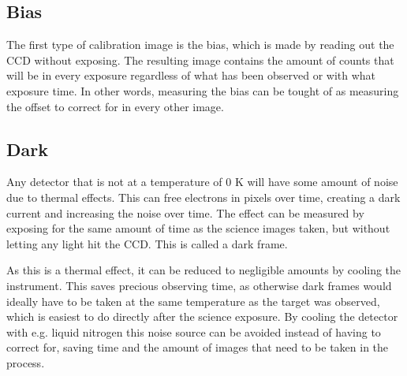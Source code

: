 \documentclass[a4paper,oneside,12pt, class=Latex/Classes/PhDthesisPSnPDF, crop=false]{standalone}
\begin{document}
\subsection{Bias}
The first type of calibration image is the bias, which is made by reading out the CCD without exposing. The resulting image contains the amount of counts that will be in every exposure regardless of what has been observed or with what exposure time. In other words, measuring the bias can be tought of as measuring the offset to correct for in every other image.


\subsection{Dark}
Any detector that is not at a temperature of 0 K will have some amount of noise due to thermal effects. This can free electrons in pixels over time, creating a dark current and increasing the noise over time. The effect can be measured by exposing for the same amount of time as the science images taken, but without letting any light hit the CCD. This is called a dark frame.

As this is a thermal effect, it can be reduced to negligible amounts by cooling the instrument. This saves precious observing time, as otherwise dark frames would ideally have to be taken at the same temperature as the target was observed, which is easiest to do directly after the science exposure. By cooling the detector with e.g. liquid nitrogen this noise source can be avoided instead of having to correct for, saving time and the amount of images that need to be taken in the process.

\end{document}
